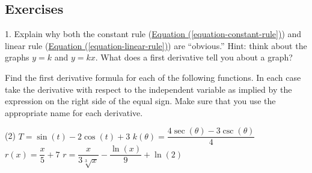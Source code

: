 \documentclass[12pt,]{book}
\theoremstyle{plain}
\theoremstyle{definition}
\numberwithin{equation}{section}
\newcommand{\fe}[2]{#1\mathopen{}\left(#2\right)\mathclose{}}
\begin{document}
\subsection[Exercises]{Exercises}\label{exercises-36}
\begin{exerciselist}
\item[1.]\hypertarget{exercise-366}{\null}Explain why both the constant rule (\hyperref[equation-constant-rule]{Equation (\ref{equation-constant-rule})}) and linear rule (\hyperref[equation-linear-rule]{Equation (\ref{equation-linear-rule})}) are ``obvious.'' Hint: think about the graphs \(y=k\) and \(y=kx\).  What does a first derivative tell you about a graph?%
\par\smallskip
\end{exerciselist}
\hypertarget{exercisegroup-75}{\null}Find the first derivative formula for each of the following functions.  In each case take the derivative with respect to the independent variable as implied by the expression on the right side of the equal sign.  Make sure that you use the appropriate name for each derivative.%
\par
\begin{exercisegroup}(2)
\exercise[2.]\hypertarget{exercise-367}{\null}\(T=\fe{\sin}{t}-2\fe{\cos}{t}+3\)%
\exercise[3.]\hypertarget{exercise-368}{\null}\(\fe{k}{\theta}=\dfrac{4\fe{\sec}{\theta}-3\fe{\csc}{\theta}}{4}\)%
\exercise[4.]\hypertarget{exercise-369}{\null}\(\fe{r}{x}=\dfrac{x}{5}+7\)%
\exercise[5.]\hypertarget{exercise-370}{\null}\(r=\dfrac{x}{3\sqrt[3]{x}}-\dfrac{\fe{\ln}{x}}{9}+\fe{\ln}{2}\)%
\end{exercisegroup}
\par\smallskip\noindent
\typeout{************************************************}
\typeout{************************************************}
\end{document}
